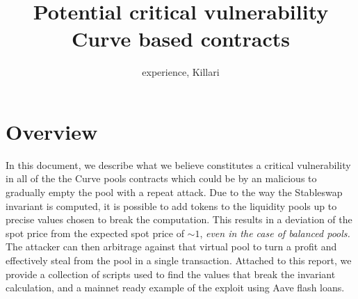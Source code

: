 \documentclass{article}
\title{Potential critical vulnerability Curve based contracts}
\author{experience, Killari}
\begin{document}
    \maketitle

    \section{Overview}

    In this document, we describe what we believe constitutes a critical vulnerability in all of the the Curve pools contracts which could be by an malicious to gradually empty the pool with a repeat attack.  Due to the way the Stableswap invariant is computed, it is possible to add tokens to the liquidity pools up to precise values chosen to break the computation. This results in a deviation of the spot price from the expected spot price of $\sim 1$, \textit{even in the case of balanced pools.} The attacker can then arbitrage against that virtual pool to turn a profit and effectively steal from the pool in a single transaction. Attached to this report, we provide a collection of scripts used to find the values that break the invariant calculation, and a mainnet ready example of the exploit using Aave flash loans. 
\end{document}
